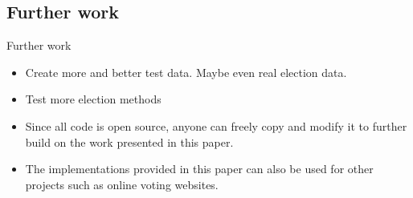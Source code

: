 \documentclass[xcolor=table]{beamer}
\begin{document}
\subsection{Further work}
\begin{frame}{Further work}
\begin{itemize}
    \item Create more and better test data. Maybe even real election data.
    \item Test more election methods
    \item Since all code is open source, anyone can freely copy and modify it to further build on the work presented in this paper.
    \item The implementations provided in this paper can also be used for other projects such as online voting websites.
\end{itemize}
    
\end{frame}
\end{document}
